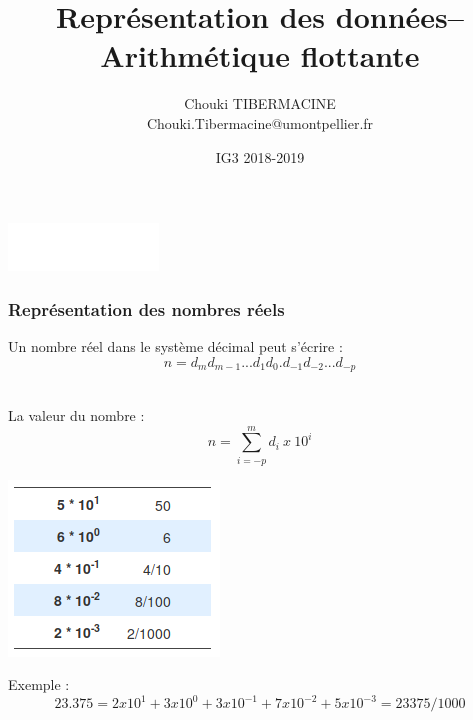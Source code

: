 \documentclass{beamer}
\title[Arithmétique flottante]{Représentation des données\break{}-- Arithmétique
flottante}
\author[C.~Tibermacine]{\large{Chouki TIBERMACINE}\\
\vspace{1cm}
\small{Chouki.Tibermacine@umontpellier.fr}}
\institute{Polytech Montpellier}
\date{\tiny{IG3 2018-2019}}
\begin{document}
\begin{frame}
\titlepage
\begin{center}
\includegraphics[width=4cm]{figs/polytech.png}
\end{center}
\end{frame}

\begin{frame}
\frametitle{Représentation des nombres réels}

\begin{itemize}
\item Un nombre réel dans le système décimal peut s'écrire :\\
  $$n = d_md_{m-1}...d_1d_0.d_{-1}d_{-2}...d_{-p}$$\\
  
\begin{minipage}[b]{0.6\linewidth} 
	\item La valeur du nombre :
  		$$n=\sum_{i=-p}^{m} d_i~x~10^i $$
\end{minipage}
\begin{minipage}[b]{0.38\linewidth} 
	\centering
	\includegraphics[trim = 0cm 0cm 0cm 0cm, clip,scale=0.3]{figs/positivePower.png} 
\end{minipage}
\item  Exemple : $$23.375=2x10^1+3x10^0+3x10^{-1}+7x10^{-2}+5x10^{-3}=23375/1000$$
\end{itemize}
\end{frame}
\end{document}
